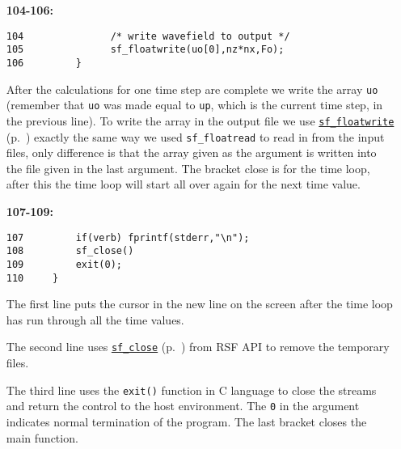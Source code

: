 \begin{itemize}
\item [\bf 104-106:]
\begin{verbatim}
104               /* write wavefield to output */
105               sf_floatwrite(uo[0],nz*nx,Fo);
106         }
\end{verbatim}
After the calculations for one time step are complete we write the array \texttt{uo} (remember that \texttt{uo} was made equal to \texttt{up}, which is the current time step, in the previous line). To write the array in the output file we use \hyperref[sec:sf_floatwrite]{\texttt{sf\_floatwrite}} (p.~\pageref{sec:sf_floatwrite}) exactly the same way we used \texttt{sf\_floatread} to read in from the input files, only difference is that the array given as the argument is written into the file given in the last argument. The bracket close is for the time loop, after this the time loop will start all over again for the next time value.  


\item [\bf 107-109:]
\begin{verbatim}
107         if(verb) fprintf(stderr,"\n");    
108         sf_close()
109         exit(0);
110     }
\end{verbatim}
The first line puts the cursor in the new line on the screen after the time loop has run through all the time values.

The second line uses \hyperref[sec:sf_close]{\texttt{sf\_close}} (p.~\pageref{sec:sf_close}) from RSF API to remove the temporary files.

The third line uses the \texttt{exit()} function in C language to close the streams and return the control to the host environment. The \texttt{0} in the argument indicates normal termination of the program. The last bracket closes the main function.

\end{itemize}














%

%

%



